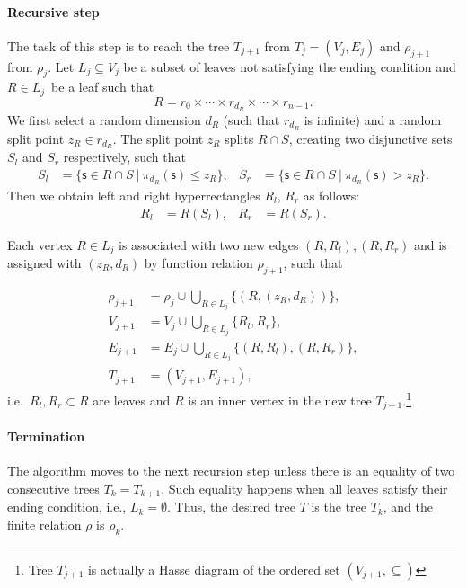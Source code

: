 \paragraph{Recursive step}
The task of this step is to reach the tree \(T_{j+1}\) from \(T_{j} = (V_j, E_j)\) and $\rho_{j+1}$ from $\rho_{j}.$
Let \(L_j \subseteq V_j\) be a subset of leaves not satisfying the
ending condition
and \(R \in L_j\)\ be a leaf such that
\[R =  r_0 \times \cdots \times r_{d_R} \times \cdots \times r_{n-1}. \]
We first select a random dimension $d_R$ (such that $r_{d_R}$ is infinite) and a random split point $z_R \in r_{d_R}$.
The split point $z_R$ splits $R \cap S$, creating two disjunctive sets $S_l$ and $S_r$ respectively, such that
\begin{align*}
S_l &= \{ \mathsf{s} \in{R \cap S}\ |\ \pi_{d_R}(\mathsf{s})\le z_R\},&
S_r &= \{ \mathsf{s} \in{R \cap S}\ |\ \pi_{d_R}(\mathsf{s}) > z_R\}.
\end{align*}
Then we obtain left and right hyperrectangles \(R_l\), \(R_r\) as
follows:
\begin{align*}
R_l &= R(S_l),&
R_r &= R(S_r).
\end{align*}

Each vertex \(R \in L_j\) is associated with two new
edges \((R,R_l ), (R, R_r)\) and is assigned with $(z_R,d_R)$ by function relation $\rho_{j+1}$, such that


\begin{align*}
   \rho_{j+1} &= \rho_j \cup \bigcup_{R \in L_j} \{(R, (z_R, d_R))\}, \\
   V_{j+1} &= V_j \cup \bigcup_{R \in L_j} \{R_l, R_r\}, \\
   E_{j+1} &= E_j \cup \bigcup_{R \in L_j} \{(R, R_l), (R,R_r)\},\\
   T_{j+1} &= (V_{j+1}, E_{j+1}),
\end{align*}
i.e.~${R_l, R_r} \subset R$ are leaves and $R$ is an inner vertex in the new tree
\(T_{j+1}\).\footnote{Tree \(T_{j+1}\) is actually a Hasse diagram of the ordered set
\((V_{j+1},\subseteq)\)}


\paragraph{Termination} The algorithm moves to the next recursion step unless there is an equality of two consecutive trees \(T_k = T_{k+1}\). Such equality happens when all leaves satisfy their ending condition, i.e., \(L_k = \emptyset\).
Thus, the desired tree $T$ is the tree $T_k$, and the finite relation $\rho$ is $\rho_k$.


